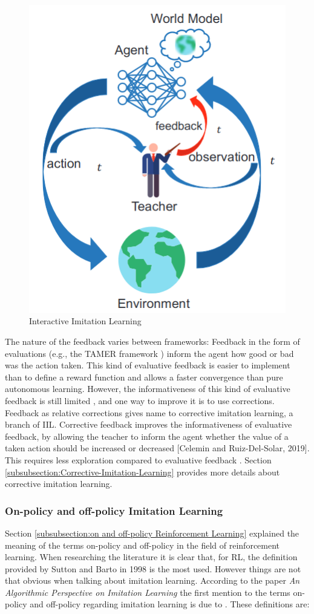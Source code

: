 \begin{figure}[H]
    \centering
    \includegraphics[width=.4\textwidth]{figures/interactive_imitation_learning.png}
    \caption{Interactive Imitation Learning \cite{D-COACH-Dattari-Celemin-Ruiz-del-Solar-Kober:2018}}
    \label{fig:interactive_imitation_learning}
\end{figure}

 The nature of the feedback varies between frameworks: Feedback in the form of evaluations (e.g., the TAMER framework \cite{TAMER-Knox-Stone:2009}) inform the agent how good or bad was the action taken. This kind of evaluative feedback is easier to implement than to define a reward function and allows a faster convergence than pure autonomous learning. 
However, the informativeness of this kind of evaluative feedback is still limited \cite{types-feedback-najar:2020}, and one way to improve it is to use corrections. Feedback as relative corrections \cite{Relative-corrections-Celemin:2019} gives name to corrective imitation learning, a branch of IIL. Corrective feedback improves the informativeness of evaluative feedback, by allowing the teacher to inform the agent whether the value of a taken action should be increased or decreased [Celemin and Ruiz-Del-Solar, 2019]. This requires less exploration compared to evaluative feedback \cite{types-feedback-najar:2020}. Section \ref{subsubsection:Corrective-Imitation-Learning} provides more details about corrective imitation learning.




\subsubsection{On-policy and off-policy Imitation Learning}
\label{subsubsection:on and off-policy Imitation Learning}

Section \ref{subsubsection:on and off-policy Reinforcement Learning} explained the meaning of the terms on-policy and off-policy in the field of reinforcement learning. When researching the literature it is clear that, for RL,  the definition provided by Sutton and Barto in 1998 is the most used. However things are not that obvious when talking about imitation learning. According to the paper \textit{An Algorithmic Perspective on Imitation Learning} \cite{Osa:2018} the first mention to the terms on-policy and off-policy regarding imitation learning is due to \cite{DBLP:journals/corr/LaskeyLHLMFG17}. These definitions are:
\setlength{\parskip}{1em} 


